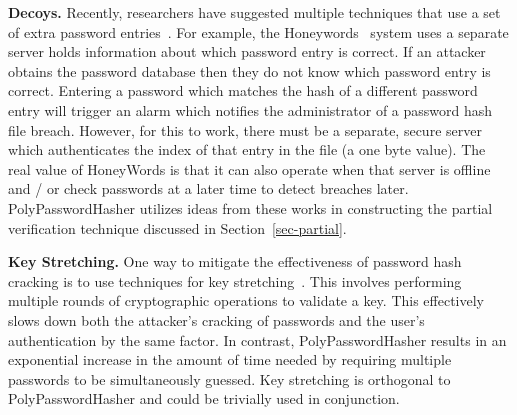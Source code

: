 {\bf Decoys.}
Recently, researchers have suggested multiple techniques that use a set of 
extra password entries~\cite{Kontaxis_CCS_2013, juels2013honeywords}.  For 
example, the Honeywords~\cite{juels2013honeywords}
system uses a separate server holds information about which password entry is 
correct.   If an 
attacker obtains the password database then they do not know which password 
entry is correct.   Entering a password which matches the hash of a 
different password entry will trigger an alarm which notifies the 
administrator of a password hash file breach.   However, for this 
to work, there must be a separate, secure server which authenticates 
the index of that entry in the file (a one byte value).   
The real value of HoneyWords is that it can also operate when that server is
offline and / or check passwords at a later time to detect breaches later.
PolyPasswordHasher utilizes ideas from these works in constructing the partial
verification technique discussed in Section~\ref{sec-partial}.

{\bf Key Stretching.}
One way to mitigate the effectiveness of password hash cracking is to
use techniques for key stretching~\cite{kelsey1998secure}.   This involves
performing multiple rounds of cryptographic operations to validate a key.
This effectively slows down both the attacker's cracking of passwords and the
user's authentication by the same factor.   In contrast, PolyPasswordHasher results 
in an exponential increase in the amount of time needed by requiring multiple
passwords to be simultaneously guessed.  Key stretching is orthogonal
to PolyPasswordHasher and could be trivially used in conjunction.



